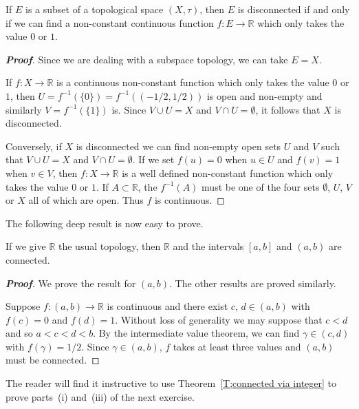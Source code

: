 \begin{theorem}\label{T;connected via integer}
If $E$ is a subset of a topological
space $(X,\tau)$, then $E$ is disconnected if and
only if we can find a non-constant continuous
function $f:E\rightarrow{\mathbb R}$ which only
takes the value $0$ or $1$.
\end{theorem}
\begin{proof}[\bf Proof] Since we are dealing with a subspace topology,
we can take $E=X$.

If $f:X\rightarrow{\mathbb R}$ is a continuous
non-constant function which only
takes the value $0$ or $1$, then
$U=f^{-1}(\{0\})=f^{-1}((-1/2,1/2))$ is open and non-empty
and similarly $V=f^{-1}(\{1\})$ is. Since $V\cup U=X$
and $V\cap U=\emptyset$, it follows that $X$ is disconnected.

Conversely, if $X$ is disconnected we can find non-empty
open sets $U$ and $V$ such that  $V\cup U=X$
and $V\cap U=\emptyset$. If we set $f(u)=0$ when $u\in U$
and $f(v)=1$ when $v\in V$, then
$f:X\rightarrow{\mathbb R}$ is a well defined
non-constant function which only
takes the value $0$ or $1$. If $A\subset{\mathbb R}$,
the $f^{-1}(A)$ must be one of the four sets
$\emptyset$, $U$, $V$ or $X$ all of which are open.
Thus $f$ is continuous.
\end{proof}



The following deep result is now easy to prove.



\begin{theorem}\label{T;reals connected}
If we give ${\mathbb R}$ the usual topology,
then ${\mathbb R}$ and the  intervals $[a,b]$
and $(a,b)$ are connected.
\end{theorem}
\begin{proof}[\bf Proof] We prove the result for $(a,b)$. The other
results are proved similarly.

Suppose $f:(a,b)\rightarrow{\mathbb R}$ is continuous
and there exist $c,\,d\in (a,b)$ with $f(c)=0$
and $f(d)=1$. Without loss of generality
we may suppose that $c<d$ and so $a<c<d<b$.
By the intermediate value theorem, we can find $\gamma\in(c,d)$
with $f(\gamma)=1/2$. Since $\gamma\in(a,b)$, $f$ takes
at least three values and $(a,b)$ must be connected.
\end{proof}



The reader will find it instructive to use Theorem~\ref{T;connected via integer} to prove parts~(i) and~(iii) of the next exercise.



